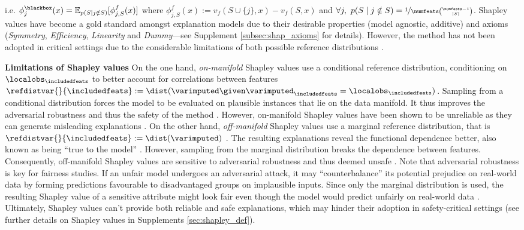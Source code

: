\documentclass{article}
\theoremstyle{plain}
\theoremstyle{definition}
\theoremstyle{remark}
\theoremstyle{mystyle}
\newcommand{\coalitionshapley}[4]{\phi^{#1}_{#3,#2}(#4)}
\begin{document}
 i.e. $\phi_j^\blackbox(x) = \mathbb{E}_{p(S \mid j \notin S)} [\coalitionshapley{f}{S}{j}{x}]$ where  $\coalitionshapley{f}{S}{j}{x} := v_f(S \cup \{j\}, x) - v_f(S, x)$ and $ \forall j, \ p(S \mid j \notin S) = \nicefrac{1}{\numfeats\binom{\numfeats-1}{|S|}}$.
Shapley values have become a gold standard amongst explanation models due to their desirable properties (model agnostic, additive) and axioms (\textit{Symmetry}, \emph{Efficiency}, \emph{Linearity} and \emph{Dummy}---see Supplement \ref{subsec:shap_axioms} for details). However, the method has not been adopted in critical settings due to the considerable limitations of both possible reference distributions .



\textbf{Limitations of Shapley values} \quad On the one hand, \textit{on-manifold} Shapley values  use a conditional reference distribution, conditioning on $\localobs_{\includedfeats}$ to better account for correlations between features $\refdistvar{}{\includedfeats}:=\dist({\varimputed\given\varimputed_{\includedfeats}=\localobs_{\includedfeats}})$. Sampling from a conditional distribution forces the model to be evaluated on plausible instances that lie on the data manifold. It thus improves the adversarial robustness and thus the safety of the method . However, on-manifold Shapley values have been shown to be unreliable as they can generate misleading explanations . On the other hand, \textit{off-manifold} Shapley values use a marginal reference distribution, that is $\refdistvar{}{\includedfeats}:=\dist({\varimputed})$ . The resulting explanations reveal the functional dependence better, also known as being ``true to the model'' . However, sampling from the marginal distribution breaks the dependence between features. Consequently, off-manifold Shapley values are sensitive to adversarial robustness and thus deemed unsafe . Note that adversarial robustness is key for fairness studies. If an unfair model undergoes an adversarial attack, it may ``counterbalance'' its potential prejudice on real-world data by forming predictions favourable to disadvantaged groups on implausible inputs. Since only the marginal distribution is used, the resulting Shapley value of a sensitive attribute might look fair even though the model would predict unfairly on real-world data . Ultimately, Shapley values can't provide both reliable and safe explanations, which may hinder their adoption in safety-critical settings (see further details on Shapley values in Supplements \ref{sec:shapley_def}). 
\end{document}
